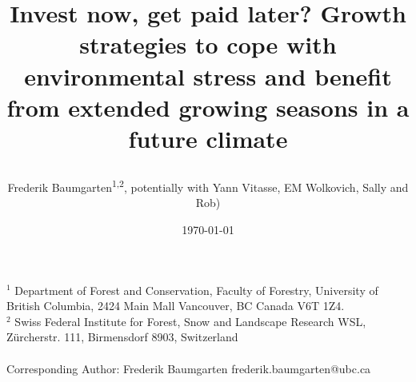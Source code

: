 \documentclass{article}
\begin{document}
	
	
	\title{Invest now, get paid later? Growth strategies to cope with environmental stress and benefit from extended growing seasons in a future climate %
		
		
	} 
	
	\date{\today}
	\author{Frederik Baumgarten\textsuperscript{1,2}, potentially with Yann Vitasse, EM Wolkovich, Sally and Rob)}
	\maketitle
	
	$^1$ Department of Forest and Conservation, Faculty of Forestry, University of British Columbia, 2424 Main Mall
	Vancouver, BC Canada V6T 1Z4. \\
	
	
	
	$^2$  Swiss Federal Institute for Forest, Snow and Landscape Research WSL, Zürcherstr. 111, Birmensdorf 8903, Switzerland\\ \\
	
	Corresponding Author: Frederik Baumgarten frederik.baumgarten@ubc.ca \\
	
	
	
	
\end{document}
